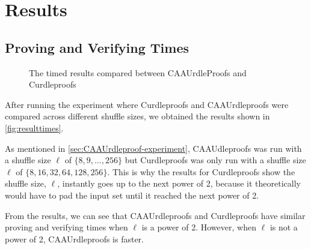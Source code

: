 \section{Results}\label{sec:results}
\subsection{Proving and Verifying Times}\label{subsec:results:provingverifying}

\begin{figure}[!htb]
    \centering
    \qquad
    \caption{The timed results compared between CAAUrdleProofs and Curdleproofs}%
    \label{fig:resulttimes}%
\end{figure}

After running the experiment where Curdleproofs and CAAUrdleproofs were compared across different shuffle sizes, we obtained the results shown in \autoref{fig:resulttimes}.

As mentioned in \autoref{sec:CAAUrdleproof-experiment}, CAAUdleproofs was run with a shuffle size $\ell$ of $\{8,9,\dots,256\}$ but Curdleproofs was only run with a shuffle size $\ell$ of $\{8,16,32,64,128,256\}$.
This is why the results for Curdleproofs show the shuffle size, $\ell$, instantly goes up to the next power of 2, because it theoretically would have to pad the input set until it reached the next power of 2.

From the results, we can see that CAAUrdleproofs and Curdleproofs have similar proving and verifying times when $\ell$ is a power of 2.
However, when $\ell$ is not a power of 2, CAAUrdleproofs is faster.

